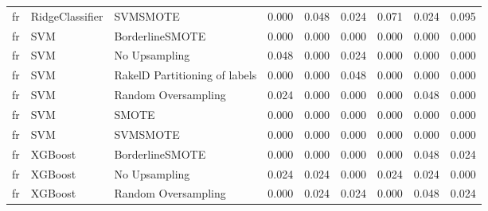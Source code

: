 \begin{tabular}{lllllllll}
      fr &                 RidgeClassifier &                      SVMSMOTE &     0.000 &                     0.048 &                 0.024 &                  0.071 &                                   0.024 &     0.095 \\
      fr &                             SVM &               BorderlineSMOTE &     0.000 &                     0.000 &                 0.000 &                  0.000 &                                   0.000 &     0.000 \\
      fr &                             SVM &                 No Upsampling &     0.048 &                     0.000 &                 0.024 &                  0.000 &                                   0.000 &     0.000 \\
      fr &                             SVM & RakelD Partitioning of labels &     0.000 &                     0.000 &                 0.048 &                  0.000 &                                   0.000 &     0.000 \\
      fr &                             SVM &           Random Oversampling &     0.024 &                     0.000 &                 0.000 &                  0.000 &                                   0.048 &     0.000 \\
      fr &                             SVM &                         SMOTE &     0.000 &                     0.000 &                 0.000 &                  0.000 &                                   0.000 &     0.000 \\
      fr &                             SVM &                      SVMSMOTE &     0.000 &                     0.000 &                 0.000 &                  0.000 &                                   0.000 &     0.000 \\
      fr &                         XGBoost &               BorderlineSMOTE &     0.000 &                     0.000 &                 0.000 &                  0.000 &                                   0.048 &     0.024 \\
      fr &                         XGBoost &                 No Upsampling &     0.024 &                     0.024 &                 0.000 &                  0.024 &                                   0.024 &     0.000 \\
      fr &                         XGBoost &           Random Oversampling &     0.000 &                     0.024 &                 0.024 &                  0.000 &                                   0.048 &     0.024 \\

\end{tabular}
